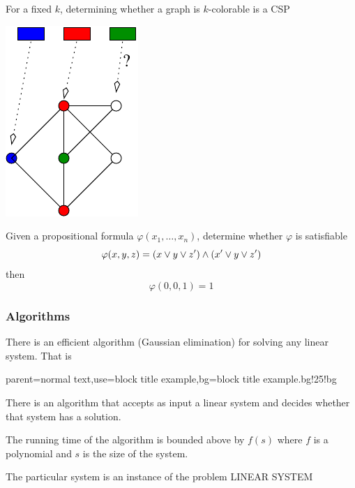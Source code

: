 \documentclass[12pt,xcolor=dvipsnames,mathserif%
   ]{beamer}
\renewcommand{\.}{\cdot}
\let\emph=\alert
\renewcommand{\phi}{\ensuremath{\varphi}}
\begin{document}
\begin{frame}
  For a fixed $k$, determining whether a graph is $k$-colorable is a CSP
  \begin{center}
    \includegraphics{inputs/k-col}
  \end{center}
\end{frame}


\begin{frame}
Given a propositional formula $\phi(x_1,\dots,x_n)$, determine whether $\phi$ is satisfiable
\bigskip
\begin{equation*}
\phi(x,y,z) = (x\join y \join z') \meet (x'\join y \join z')
\end{equation*}
then 
\begin{equation*}
\phi(0,0,1) = 1
\end{equation*}
\end{frame}

\begin{frame}
  \frametitle{Algorithms}
  There is an efficient algorithm (Gaussian elimination) for solving any
  linear system.
  That is

%
{parent=normal text,use=block title example,bg=block title example.bg!25!bg}
  \begin{exampleblock}{}
    There is an algorithm that accepts as \emph{input} a linear system
    and decides whether that system has a solution.

    \smallskip
    The running time of the algorithm is bounded above by $f(s)$ where
    $f$ is a polynomial and $s$ is the size of the system.
  \end{exampleblock}
  \pause

  The particular system is an \emph{instance} of the \emph{problem}
  LINEAR SYSTEM
  
\end{frame}
\end{document}
